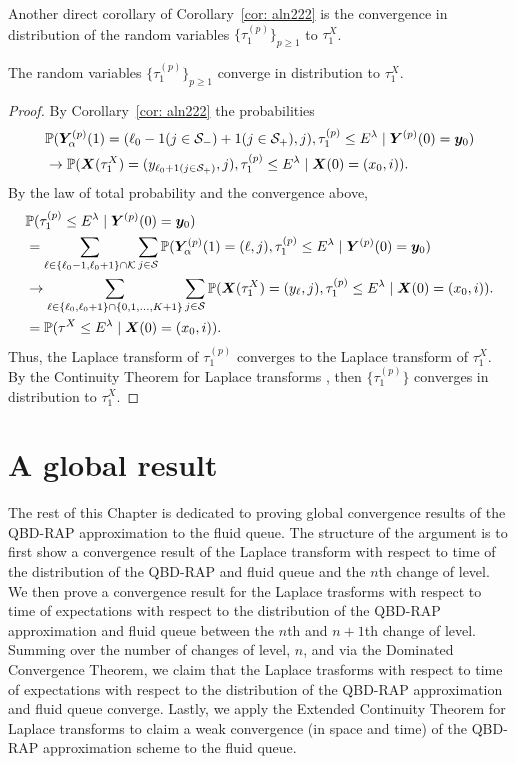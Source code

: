 Another direct corollary of Corollary~\ref{cor: aln222} is the convergence in distribution of the random variables \(\{\tau_1^{(p)}\}_{p\geq 1}\) to \(\tau_1^X\). 
\begin{cor}
	The random variables \(\{\tau_1^{(p)}\}_{p\geq 1}\) converge in distribution to \(\tau_1^X\). 
\end{cor}
\begin{proof}
	By Corollary~\ref{cor: aln222} the probabilities 
	\begin{align}
		&\mathbb P(\boldsymbol Y_{\alpha}^{(p)}(1) = (\ell_0-1(j\in\mathcal{S}_-)+1(j\in\mathcal{S}_+),j),\tau_1^{(p)}\leq E^\lambda
            	 \mid \boldsymbol Y^{(p)}(0) = \boldsymbol y_0) \nonumber
		\\&\to  
			\mathbb P(\boldsymbol X(\tau_1^X) = (y_{\ell_0+1(j\in\mathcal{S}_+)}, j),\tau_1^{(p)}\leq E^\lambda \mid \boldsymbol X(0) = (x_0,i)).\nonumber
	\end{align}
	By the law of total probability and the convergence above, 
	\begin{align}
		&\mathbb P( \tau_1^{(p)}\leq E^\lambda
		\mid \boldsymbol Y^{(p)}(0) = \boldsymbol y_0) \nonumber
		\\&=\sum_{\ell\in\{\ell_0-1,\ell_0+1\}\cap\mathcal K}\sum_{j\in\mathcal{S}}\mathbb P(\boldsymbol Y_{\alpha}^{(p)}(1) = (\ell,j),\tau_1^{(p)}\leq E^\lambda
		\mid \boldsymbol Y^{(p)}(0) = \boldsymbol y_0) \nonumber
		\\&\to  
		\sum_{\ell\in\{\ell_0,\ell_0+1\}\cap\{0,1,\dots,K+1\}}\sum_{j\in\mathcal{S}}\mathbb P(\boldsymbol X(\tau_1^X) = (y_{\ell}, j),\tau_1^{(p)}\leq E^\lambda \mid \boldsymbol X(0) = (x_0,i)).\nonumber
		\\&=\mathbb P(\tau^X\leq E^\lambda \mid \boldsymbol X(0) = (x_0,i) ).
	\end{align}
	Thus, the Laplace transform of \(\tau_1^{(p)}\) converges to the Laplace transform of \(\tau_1^X\). By the Continuity Theorem for Laplace transforms \cite[Chapter XIII, Theorem 2a]{feller1957}, then \(\{\tau_1^{(p)}\}\) converges in distribution to \(\tau_1^X\). 
\end{proof}

\section{A global result}\label{sec: local to global}
The rest of this Chapter is dedicated to proving global convergence results of the QBD-RAP approximation to the fluid queue. The structure of the argument is to first show a convergence result of the Laplace transform with respect to time of the distribution of the QBD-RAP and fluid queue and the \(n\)th change of level. We then prove a convergence result for the Laplace trasforms with respect to time of expectations with respect to the distribution of the QBD-RAP approximation and fluid queue between the \(n\)th and \(n+1\)th change of level. Summing over the number of changes of level, \(n\), and via the Dominated Convergence Theorem, we claim that the Laplace trasforms with respect to time of expectations with respect to the distribution of the QBD-RAP approximation and fluid queue converge. Lastly, we apply the Extended Continuity Theorem for Laplace transforms \cite[Chapter XIII, Theorem 2a]{feller1957} to claim a weak convergence (in space and time) of the QBD-RAP approximation scheme to the fluid queue.

